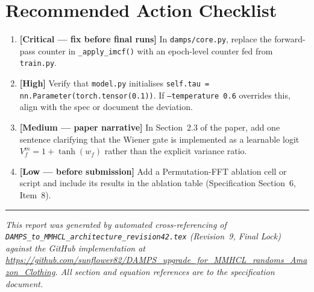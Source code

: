 \documentclass[12pt,a4paper]{article}
\begin{document}
\section*{Recommended Action Checklist}

\begin{enumerate}[label=\textbf{\arabic*.}, leftmargin=2em]

  \item \textbf{[Critical — fix before final runs]} In \texttt{damps/core.py},
    replace the forward-pass counter in \texttt{\_apply\_imcf()} with an
    epoch-level counter fed from \texttt{train.py}.

  \item \textbf{[High]} Verify that \texttt{model.py} initialises
    \texttt{self.tau = nn.Parameter(torch.tensor(0.1))}.  If
    \texttt{--temperature 0.6} overrides this, align with the spec or document
    the deviation.

  \item \textbf{[Medium — paper narrative]} In Section~2.3 of the paper, add
    one sentence clarifying that the Wiener gate is implemented as a learnable
    logit $V^m_f = 1 + \tanh(w_f)$ rather than the explicit variance ratio.

  \item \textbf{[Low — before submission]} Add a Permutation-FFT ablation cell
    or script and include its results in the ablation table (Specification
    Section~6, Item~8).

\end{enumerate}

\vspace{2em}
\hrule
\vspace{0.5em}
\noindent\small\textit{This report was generated by automated cross-referencing of
\texttt{DAMPS\_to\_MMHCL\_architecture\_revision42.tex} (Revision~9, Final Lock)
against the GitHub implementation at
\url{https://github.com/sunflower82/DAMPS_upgrade_for_MMHCL_randoms_Amazon_Clothing}.
All section and equation references are to the specification document.}
\end{document}
